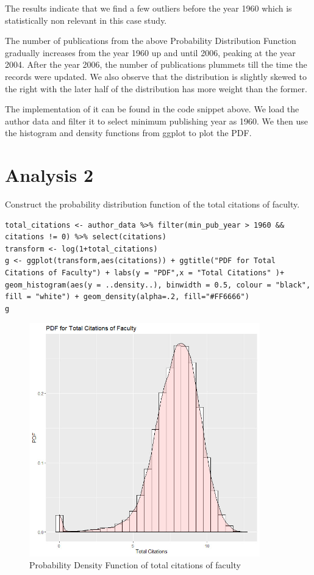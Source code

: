 \documentclass[a4paper,11pt]{article}
\theoremstyle{mytheor}
\begin{document}
The results indicate that we find a few outliers before the year 1960 which is statistically non relevant in this case study.

The number of publications from the above Probability Distribution Function gradually increases from the year 1960 up and until 2006, peaking at the year 2004. After the year 2006, the number of publications plummets till the time the records were updated. We also observe that the distribution is slightly skewed to the right with the later half of the distribution has more weight than the former.

The implementation of it can be found in the code snippet above.  We load the author data and filter it to select minimum publishing year as 1960. We then use the histogram and density functions from ggplot to plot the PDF.


\section*{Analysis 2}

Construct the probability distribution function of the total citations of faculty.

\begin{lstlisting}[label={list:second},caption=PDF calculated of the total citations of faculty]
total_citations <- author_data %>% filter(min_pub_year > 1960 && citations != 0) %>% select(citations)
transform <- log(1+total_citations)
g <- ggplot(transform,aes(citations)) + ggtitle("PDF for Total Citations of Faculty") + labs(y = "PDF",x = "Total Citations" )+ geom_histogram(aes(y = ..density..), binwidth = 0.5, colour = "black", fill = "white") + geom_density(alpha=.2, fill="#FF6666")
g
\end{lstlisting}


\begin{figure}[htp]
    \centering
    \includegraphics[width=10cm]{PDF_totalCitations.jpeg}
    \caption{Probability Density Function of total citations of faculty}
    \label{fig:galaxy}
\end{figure}
\end{document}

